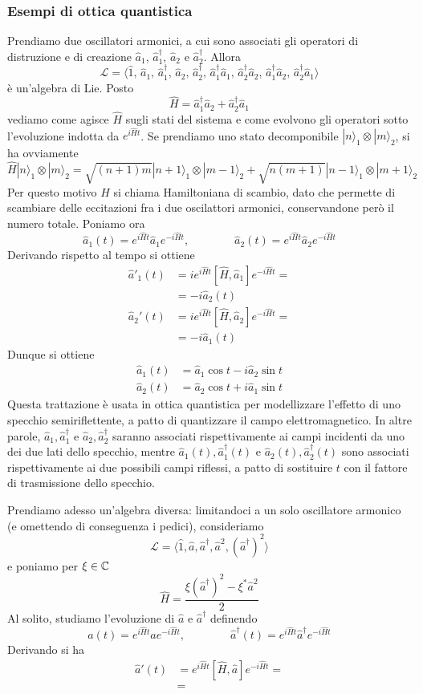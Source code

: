 \documentclass[a4paper, 11pt]{article}
\newcommand{\op}[1]{\hat{#1}}
\renewcommand{\op}[1]{\hat{#1}}
\newcommand{\ham}{\hat{H}}
\renewcommand{\ket}[1]{| #1\rangle}
\begin{document}
\subsubsection{Esempi di ottica quantistica}
Prendiamo due oscillatori armonici, a cui sono associati gli operatori di distruzione e di creazione $\hat{a}_1$, $\op a^\dagger_1$, $\op a_2$ e $\op a^\dagger_2$. Allora
\[\mathcal{L}=\langle\op 1,\,\op a_1,\,\op a^\dagger_1,\,\op a_2,\,\op a^\dagger_2,\, \op a^\dagger_1\op a_1,\, \op a^\dagger_2\op a_2,\,\op a^\dagger_1\op a_2,\,\op a^\dagger_2\op a_1\rangle\]
è un'algebra di Lie. Posto
\[\ham=\op a_1^\dagger\op a_2+\op a_2^\dagger\op a_1\]
vediamo come agisce $\ham$ sugli stati del sistema e come evolvono gli operatori sotto l'evoluzione indotta da $e^{i\ham t}$. Se prendiamo uno stato decomponibile $\ket{n}_1\otimes\ket{m}_2$, si ha ovviamente
\[\ham\ket{n}_1\otimes\ket{m}_2=\sqrt{(n+1)m}\ket{n+1}_1\otimes\ket{m-1}_2+\sqrt{n(m+1)}\ket{n-1}_1\otimes\ket{m+1}_2\]
Per questo motivo $\ham$ si chiama Hamiltoniana di scambio, dato che permette di scambiare delle eccitazioni fra i due oscilattori armonici, conservandone però il numero totale. Poniamo ora
\[\op a_1(t)=e^{i\ham t}\op a_1e^{-i\ham t},\qquad\qquad\op a_2(t)=e^{i\ham t}\op a_2e^{-i\ham t}\]
Derivando rispetto al tempo si ottiene
\begin{align*}
	\op a'_1(t)&=ie^{i\ham t}[\ham,\op a_1]e^{-i\ham t}=\\&=-i\op a_2(t)\\\op a_2'(t)&=ie^{i\ham t}[\ham,\op a_2]e^{-i\ham t}=\\&=-i\op a_1(t)
\end{align*}
Dunque si ottiene
\begin{align*}
	\op a_1(t)&=\op a_1\cos t-i\op a_2\sin t\\\op a_2(t)&=\op a_2\cos t+i\op a_1\sin t
\end{align*}
Questa trattazione è usata in ottica quantistica per modellizzare l'effetto di uno specchio semiriflettente, a patto di quantizzare il campo elettromagnetico. In altre parole, $\op a_1,\op a_1^\dagger$ e $\op a_2,\op a_2^\dagger$ saranno associati rispettivamente ai campi incidenti da uno dei due lati dello specchio, mentre $\op a_1(t),\op a^\dagger_1(t)$ e $\op a_2(t),\op a_2^\dagger(t)$ sono associati rispettivamente ai due possibili  campi riflessi, a patto di sostituire $t$ con il fattore di trasmissione dello specchio.

Prendiamo adesso un'algebra diversa: limitandoci a un solo oscillatore armonico (e omettendo di conseguenza i pedici), consideriamo
\[\mathcal{L}=\langle\op 1,\op a,\op a^\dagger,\op a^2,(\op a^\dagger)^2\rangle\]
e poniamo per $\xi\in\mathbb{C}$
\[\ham=\frac{\xi(\op a^\dagger)^2-\xi^*\op a^2}{2}\]
Al solito, studiamo l'evoluzione di $\op a$ e $\op a^\dagger$ definendo
\[\op a(t)=e^{i\ham t}\op a e^{-i\ham t},\qquad\qquad\op a^\dagger(t)=e^{i\ham t}\op a^\dagger e^{-i\ham t}\]
Derivando si ha
\begin{align*}
	\op a'(t)&=e^{i\ham t}[\ham,\op a]e^{-i\ham t}=\\&=
\end{align*}
\end{document}
